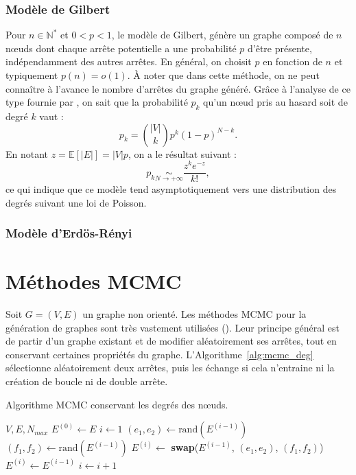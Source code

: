\documentclass[a4paper]{article}
\begin{document}
        \subsubsection{Modèle de Gilbert}
            Pour $n \in \mathbb{N}^*$ et $0 < p < 1$, le modèle de Gilbert,
            génère un graphe composé de $n$ n\oe{}uds dont chaque arrête
            potentielle a une probabilité $p$ d'être présente, indépendamment
            des autres arrêtes.
            En général, on choisit $p$ en fonction de $n$ et typiquement
            $p(n) = o(1)$. \`A noter que dans cette méthode, on ne peut
            connaître à l'avance le nombre d'arrêtes du graphe généré.
            Gr\^ace à l'analyse de ce type fournie par \cite{newman2001random},
            on sait que la probabilité $p_k$ qu'un n\oe{}ud pris au hasard
            soit de degré $k$ vaut :
            \[
                p_k = \binom{|V|}{k} p^k (1 - p)^{N - k}.
            \]
            En notant $z = \mathbb{E}\left[|E|\right] = |V|p$, on a le résultat
            suivant :
            \[
                p_k \underset{N \rightarrow +\infty}{\sim}
                \frac{z^k e^{-z}}{k!},
            \]
            ce qui indique que ce modèle tend asymptotiquement vers une
            distribution des degrés suivant une loi de Poisson.

        \subsubsection{Modèle d'Erdös-Rényi}

\section{Méthodes MCMC}
\label{sec:methodes_mcmc}
    Soit $G = (V, E)$ un graphe non orienté.
    Les méthodes MCMC pour la génération de graphes sont très vastement
    utilisées (\cite{rao1996markov}). Leur principe général est de partir
    d'un graphe existant et de modifier aléatoirement ses arrêtes, tout en
    conservant certaines propriétés du graphe. L'Algorithme~\ref{alg:mcmc_deg}
    sélectionne aléatoirement deux arrêtes, puis les échange si cela
    n'entraine ni la création de boucle ni de double arrête.

    \begin{algorithm}
        \caption{Algorithme MCMC conservant les degrés des n\oe{}uds.}
        \label{alg:mcmc_deg}
        \begin{algorithmic}[1]
            \Require $V, E, N_{max}$
            \State $E^{(0)} \gets E$
            \State $i \gets 1$
                \State $(e_1, e_2) \gets \text{rand}(E^{(i-1)})$
                \State $(f_1, f_2) \gets \text{rand}(E^{(i-1)})$
                    \State $E^{(i)} \gets$
                        \textbf{swap}($E^{(i-1)}$, $(e_1, e_2)$, $(f_1, f_2)$)
                \Else
                    \State $E^{(i)} \gets E^{(i-1)}$
                \EndIf
                \State $i \gets i + 1$
            \EndWhile
        \end{algorithmic}
    \end{algorithm}
\end{document}
